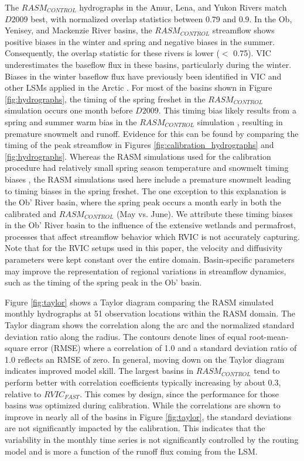 \documentclass[jgrga, draft]{agutex}
\begin{document}
\begin{article}
The $RASM_{CONTROL}$ hydrographs in the Amur, Lena, and Yukon Rivers match $D2009$ best, with normalized overlap statistics between 0.79 and 0.9.
In the Ob, Yenisey, and Mackenzie River basins, the $RASM_{CONTROL}$ streamflow shows positive biases in the winter and spring and negative biases in the summer.
Consequently, the overlap statistic for these rivers is lower ($<$ 0.75).
VIC underestimates the baseflow flux in these basins, particularly during the winter.
Biases in the winter baseflow flux have previously been identified in VIC and other LSMs applied in the Arctic \citep{Slater_2007}.
For most of the basins shown in Figure \ref{fig:hydrographs}, the timing of the spring freshet in the $RASM_{CONTROL}$ simulation occurs one month before $D2009$.
This timing bias likely results from a spring and summer warm bias in the $RASM_{CONTROL}$ simulation \citep{Hamman_2016,Cassano_2016}, resulting in premature snowmelt and runoff.
Evidence for this can be found by comparing the timing of the peak streamflow in Figures \ref{fig:calibration_hydrographs} and \ref{fig:hydrographs}.
Whereas the RASM simulations used for the calibration procedure had relatively small spring season temperature and snowmelt timing biases \citep{Hamman_2016}, the RASM simulations used here include a premature snowmelt leading to timing biases in the spring freshet.
The one exception to this explanation is the Ob' River basin, where the spring peak occurs a month early in both the calibrated and $RASM_{CONTROL}$ (May vs. June).
We attribute these timing biases in the Ob' River basin to the influence of the extensive wetlands and permafrost, processes that affect streamflow behavior which RVIC is not accurately capturing.
Note that for the RVIC setups used in this paper, the velocity and diffusivity parameters were kept constant over the entire domain.
Basin-specific parameters may improve the representation of regional variations in streamflow dynamics, such as the timing of the spring peak in the Ob' basin.

Figure \ref{fig:taylor} shows a Taylor diagram comparing the RASM simulated monthly hydrographs at 51 observation locations within the RASM domain.
The Taylor diagram shows the correlation along the arc and the normalized standard deviation ratio along the radius.
The contours denote lines of equal root-mean-square error (RMSE) where a correlation of 1.0 and a standard deviation ratio of 1.0 reflects an RMSE of zero.
In general, moving down on the Taylor diagram indicates improved model skill.
The largest basins in $RASM_{CONTROL}$ tend to perform better with correlation coefficients typically increasing by about 0.3, relative to $RVIC_{FAST}$.
This comes by design, since the performance for those basins was optimized during calibration.
While the correlations are shown to improve in nearly all of the basins in Figure \ref{fig:taylor}, the standard deviations are not significantly impacted by the calibration.
This indicates that the variability in the monthly time series is not significantly controlled by the routing model and is more a function of the runoff flux coming from the LSM.


\end{article}
\end{document}
